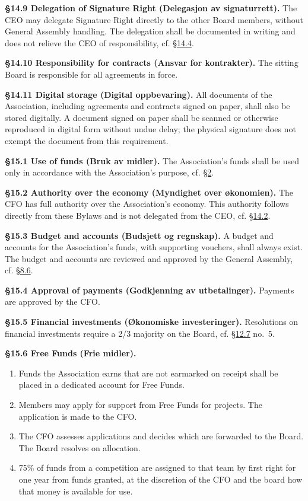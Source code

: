 \documentclass{../../../Common/Latex/Templates/rapport}
\begin{document}
\textbf{\S 14.9 Delegation of Signature Right (Delegasjon av signaturrett).}\label{bylaw:14.9} The CEO may delegate Signature Right directly to the other Board members, without General Assembly handling. The delegation shall be documented in writing and does not relieve the CEO of responsibility, cf. \hyperref[bylaw:14.4]{\S 14.4}.

\textbf{\S 14.10 Responsibility for contracts (Ansvar for kontrakter).}\label{bylaw:14.10} The sitting Board is responsible for all agreements in force.

\textbf{\S 14.11 Digital storage (Digital oppbevaring).}\label{bylaw:14.11} All documents of the Association, including agreements and contracts signed on paper, shall also be stored digitally. A document signed on paper shall be scanned or otherwise reproduced in digital form without undue delay; the physical signature does not exempt the document from this requirement.


\label{bylaw:15}
\textbf{\S 15.1 Use of funds (Bruk av midler).}\label{bylaw:15.1} The Association's funds shall be used only in accordance with the Association's purpose, cf. \hyperref[bylaw:2]{\S 2}.

\textbf{\S 15.2 Authority over the economy (Myndighet over økonomien).}\label{bylaw:15.2} The CFO has full authority over the Association's economy. This authority follows directly from these Bylaws and is not delegated from the CEO, cf. \hyperref[bylaw:14.2]{\S 14.2}.

\textbf{\S 15.3 Budget and accounts (Budsjett og regnskap).}\label{bylaw:15.3} A budget and accounts for the Association's funds, with supporting vouchers, shall always exist. The budget and accounts are reviewed and approved by the General Assembly, cf. \hyperref[bylaw:8.6]{\S 8.6}.

\textbf{\S 15.4 Approval of payments (Godkjenning av utbetalinger).}\label{bylaw:15.4} Payments are approved by the CFO.

\textbf{\S 15.5 Financial investments (Økonomiske investeringer).}\label{bylaw:15.5} Resolutions on financial investments require a 2/3 majority on the Board, cf. \hyperref[bylaw:12.7]{\S 12.7} no.\ 5.

\textbf{\S 15.6 Free Funds (Frie midler).}\label{bylaw:15.6}
\begin{enumerate}
  \item Funds the Association earns that are not earmarked on receipt shall be placed in a dedicated account for Free Funds.
  \item Members may apply for support from Free Funds for projects. The application is made to the CFO.
  \item The CFO assesses applications and decides which are forwarded to the Board. The Board resolves on allocation.
  \item 75\% of funds from a competition are assigned to that team by first right for one year from funds granted, at the discretion of the CFO and the board how that money is available for use.
\end{enumerate}
\end{document}
